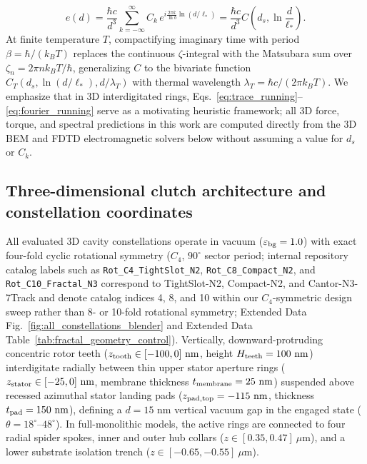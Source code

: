 \documentclass[pdflatex,sn-nature]{sn-jnl}
\begin{document}
\begin{equation}
e(d) = \frac{\hbar c}{d^3} \sum_{k=-\infty}^{\infty} C_k \, e^{i \frac{2\pi k}{\ln b} \ln(d/\ell_*)} = \frac{\hbar c}{d^3} C\!\left(d_s, \ln\frac{d}{\ell_*}\right).
\end{equation}
At finite temperature $T$, compactifying imaginary time with period $\beta = \hbar/(k_B T)$ replaces the continuous $\zeta$-integral with the Matsubara sum over $\zeta_n = 2\pi n k_B T/\hbar$, generalizing $C$ to the bivariate function $C_T(d_s, \ln(d/\ell_*), d/\lambda_T)$ with thermal wavelength $\lambda_T = \hbar c / (2\pi k_B T)$\cite{gordon2026prd}. We emphasize that in 3D interdigitated rings, Eqs.~\eqref{eq:trace_running}--\eqref{eq:fourier_running} serve as a motivating heuristic framework; all 3D force, torque, and spectral predictions in this work are computed directly from the 3D BEM and FDTD electromagnetic solvers below without assuming a value for $d_s$ or $C_k$.

\subsection*{Three-dimensional clutch architecture and constellation coordinates}
All evaluated 3D cavity constellations operate in vacuum ($\varepsilon_{\rm bg}=1.0$) with exact four-fold cyclic rotational symmetry ($C_4$, $90^\circ$ sector period; internal repository catalog labels such as \texttt{Rot\_C4\_TightSlot\_N2}, \texttt{Rot\_C8\_Compact\_N2}, and \texttt{Rot\_C10\_Fractal\_N3} correspond to TightSlot-N2, Compact-N2, and Cantor-N3-7Track and denote catalog indices 4, 8, and 10 within our $C_4$-symmetric design sweep rather than 8- or 10-fold rotational symmetry; Extended Data Fig.~\ref{fig:all_constellations_blender} and Extended Data Table~\ref{tab:fractal_geometry_control}). Vertically, downward-protruding concentric rotor teeth ($z_{\rm tooth} \in [-100, 0]\text{ nm}$, height $H_{\rm teeth} = 100\text{ nm}$) interdigitate radially between thin upper stator aperture rings ($z_{\rm stator} \in [-25, 0]\text{ nm}$, membrane thickness $t_{\rm membrane} = 25\text{ nm}$) suspended above recessed azimuthal stator landing pads ($z_{\rm pad,top} = -115\text{ nm}$, thickness $t_{\rm pad} = 150\text{ nm}$), defining a $d = 15\text{ nm}$ vertical vacuum gap in the engaged state ($\theta = 18^\circ\text{--}48^\circ$). In full-monolithic models, the active rings are connected to four radial spider spokes, inner and outer hub collars ($z \in [0.35, 0.47]\ \mu\text{m}$), and a lower substrate isolation trench ($z \in [-0.65, -0.55]\ \mu\text{m}$).
\end{document}
